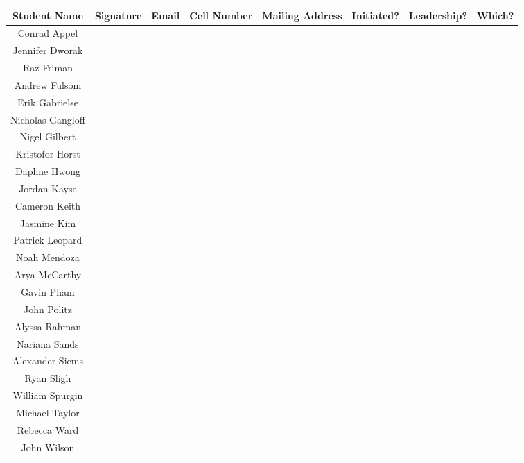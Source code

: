 \documentclass{article}
\begin{document}
\begin{table}
\begin{center}
\begin{tabular}{| c | c | c | c | c | c | c | c |}
\hline 
\textbf{Student Name} & \textbf{Signature} & \textbf{Email} & \textbf{Cell Number} &\textbf{\hspace{7em} Mailing Address\hspace{7em}} & \textbf{Initiated?} & \textbf{Leadership?}&\textbf{Which?}}\\
\hline
\hline
Conrad Appel&&&&&&&\\
\hline
Jennifer Dworak&&&&&&&\\
\hline
Raz Friman&&&&&&&\\
\hline
Andrew Fulsom&&&&&&&\\
\hline
Erik Gabrielse&&&&&&&\\
\hline
Nicholas Gangloff&&&&&&&\\
\hline
Nigel Gilbert&&&&&&&\\
\hline
Kristofor Horst&&&&&&&\\
\hline
Daphne Hwong&&&&&&&\\
\hline
Jordan Kayse&&&&&&&\\
\hline
Cameron Keith&&&&&&&\\
\hline
Jasmine Kim&&&&&&&\\
\hline
Patrick Leopard&&&&&&&\\
\hline
Noah Mendoza&&&&&&&\\
\hline
Arya McCarthy&&&&&&&\\
\hline
Gavin Pham&&&&&&&\\
\hline
John Politz&&&&&&&\\
\hline
Alyssa Rahman&&&&&&&\\
\hline
Nariana Sands&&&&&&&\\
\hline
Alexander Siems&&&&&&&\\
\hline
Ryan Sligh&&&&&&&\\
\hline
William Spurgin&&&&&&&\\
\hline
Michael Taylor&&&&&&&\\
\hline
Rebecca Ward&&&&&&&\\
\hline
John Wilson&&&&&&&\\
\hline
\end{tabular}
\end{center}
\end{table}
\end{document}
